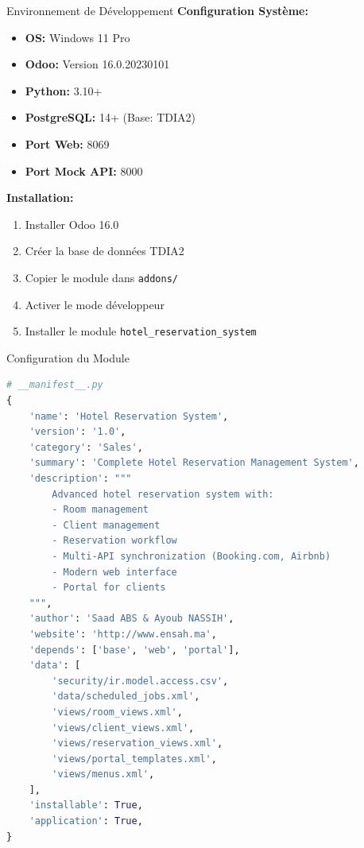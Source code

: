 \documentclass[aspectratio=169]{beamer}
\begin{document}
\begin{frame}{Environnement de Développement}
    \textbf{Configuration Système:}
    \begin{itemize}
        \item \textbf{OS:} Windows 11 Pro
        \item \textbf{Odoo:} Version 16.0.20230101
        \item \textbf{Python:} 3.10+
        \item \textbf{PostgreSQL:} 14+ (Base: TDIA2)
        \item \textbf{Port Web:} 8069
        \item \textbf{Port Mock API:} 8000
    \end{itemize}
    
    \vspace{10pt}
    \textbf{Installation:}
    \begin{enumerate}
        \item Installer Odoo 16.0
        \item Créer la base de données TDIA2
        \item Copier le module dans \texttt{addons/}
        \item Activer le mode développeur
        \item Installer le module \texttt{hotel\_reservation\_system}
    \end{enumerate}
\end{frame}

\begin{frame}[fragile]{Configuration du Module}
    \begin{lstlisting}[language=Python]
# __manifest__.py
{
    'name': 'Hotel Reservation System',
    'version': '1.0',
    'category': 'Sales',
    'summary': 'Complete Hotel Reservation Management System',
    'description': """
        Advanced hotel reservation system with:
        - Room management
        - Client management
        - Reservation workflow
        - Multi-API synchronization (Booking.com, Airbnb)
        - Modern web interface
        - Portal for clients
    """,
    'author': 'Saad ABS & Ayoub NASSIH',
    'website': 'http://www.ensah.ma',
    'depends': ['base', 'web', 'portal'],
    'data': [
        'security/ir.model.access.csv',
        'data/scheduled_jobs.xml',
        'views/room_views.xml',
        'views/client_views.xml',
        'views/reservation_views.xml',
        'views/portal_templates.xml',
        'views/menus.xml',
    ],
    'installable': True,
    'application': True,
}
    \end{lstlisting}
\end{frame}
\end{document}
